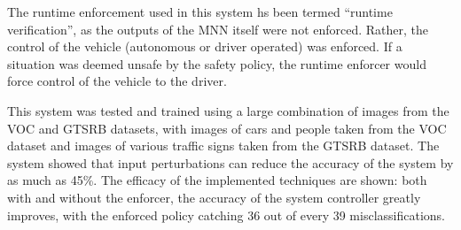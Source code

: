 The runtime enforcement used in this system hs been termed ``runtime verification'', as the outputs of the \ac{MNN} itself were not enforced.
Rather, the control of the vehicle (autonomous or driver operated) was enforced.
If a situation was deemed unsafe by the safety policy, the runtime enforcer would force control of the vehicle to the driver.

This system was tested and trained using a large combination of images from the \ac{VOC} and \ac{GTSRB} datasets, with images of cars and people taken from the \ac{VOC} dataset and images of various traffic signs taken from the \ac{GTSRB} dataset.
The system showed that input perturbations can reduce the accuracy of the system by as much as 45\%.
The efficacy of the implemented techniques are shown: both with and without the enforcer, the accuracy of the system controller greatly improves, with the enforced policy catching 36 out of every 39 misclassifications.

























